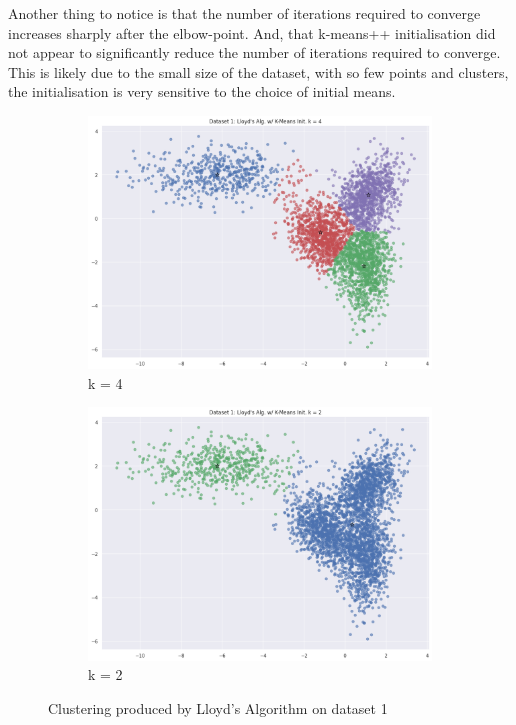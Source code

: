 \documentclass[12pt]{article}
\begin{document}
Another thing to notice is that the number of iterations required to converge increases
sharply after the elbow-point. And, that k-means++ initialisation did not appear to
significantly reduce the number of iterations required to converge. This is likely
due to the small size of the dataset, with so few points and clusters, the initialisation
is very sensitive to the choice of initial means.

\begin{figure}[ht]
    \centering
    \begin{subfigure}{0.5\textwidth}
      \centering
      \includegraphics[width=\linewidth]{7.png}
      \caption{k = 4}
      \label{fig:7}
    \end{subfigure}%
    \hfill
    \begin{subfigure}{0.5\textwidth}
      \centering
      \includegraphics[width=\linewidth]{x.png}
      \caption{k = 2}
      \label{fig:x}
    \end{subfigure}%
    \caption{Clustering produced by Lloyd's Algorithm on dataset 1}
    \label{fig:dist_1}
\end{figure}
\end{document}
